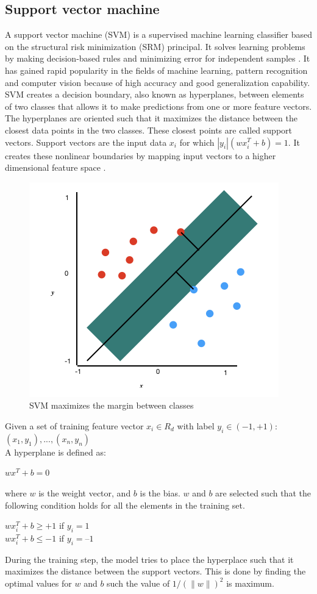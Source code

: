 \subsection{Support vector machine}
A support vector machine (SVM) is a supervised machine learning classifier based on the structural risk minimization (SRM) principal. It solves learning problems by making decision-based rules and minimizing error for independent samples \cite{svm2008}. It has gained rapid popularity in the fields of machine learning, pattern recognition and computer vision because of high accuracy and good generalization capability. SVM creates a decision boundary, also known as hyperplanes, between elements of two classes that allows it to make predictions from one or more feature vectors. The hyperplanes are oriented such that it maximizes the distance between the closest data points in the two classes. These closest points are called support vectors. Support vectors are the input data $x_i$ for which $|y_i|(wx_i^T + b)=1$. It creates these nonlinear boundaries by mapping input vectors to a higher dimensional feature space \cite{SAMANTA2003657,Nakajima2016}.
\begin{figure}[htb!]
    \centering
    \includegraphics[scale=0.75]{files/svm.png}
    \caption{SVM maximizes the margin between classes}
    \label{SVM maximizes the margin between classes}
    \end{figure}
    \FloatBarrier
    
Given a set of training feature vector $x_i \in R_d$ with label $y_i \in (−1, +1)$: $(x_1, y_1), ..., (x_n, y_n)$ \\
A hyperplane is defined as:
\begin{center}
    $wx^T + b=0$
\end{center}
where $w$ is the weight vector, and $b$ is the bias.
$w$ and $b$ are selected such that the following condition holds for all the elements in the training set.
\begin{center}
    $wx_i^T + b \geq +1$ if $y_i=1$\\
    $wx_i^T + b \leq −1$ if $y_i=–1$
\end{center}
During the training step, the model tries to place the hyperplace such that it maximizes the distance between the support vectors. This is done by finding the optimal values for $w$ and $b$ such the value of $1/(\parallel w\parallel)^2$ is maximum.

